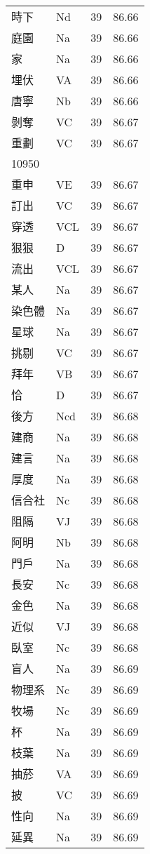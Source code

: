 \documentclass[twocolumn]{book}
\begin{document}
\begin{supertabular}{llrr}
時下 & Nd & 39 &  86.66\\
庭園 & Na & 39 &  86.66\\
家 & Na & 39 &  86.66\\
埋伏 & VA & 39 &  86.66\\
唐寧 & Nb & 39 &  86.66\\
剝奪 & VC & 39 &  86.67\\
重劃 & VC & 39 &  86.67\\
10950\\
重申 & VE & 39 &  86.67\\
訂出 & VC & 39 &  86.67\\
穿透 & VCL & 39 &  86.67\\
狠狠 & D & 39 &  86.67\\
流出 & VCL & 39 &  86.67\\
某人 & Na & 39 &  86.67\\
染色體 & Na & 39 &  86.67\\
星球 & Na & 39 &  86.67\\
挑剔 & VC & 39 &  86.67\\
拜年 & VB & 39 &  86.67\\
恰 & D & 39 &  86.67\\
後方 & Ncd & 39 &  86.68\\
建商 & Na & 39 &  86.68\\
建言 & Na & 39 &  86.68\\
厚度 & Na & 39 &  86.68\\
信合社 & Nc & 39 &  86.68\\
阻隔 & VJ & 39 &  86.68\\
阿明 & Nb & 39 &  86.68\\
門戶 & Na & 39 &  86.68\\
長安 & Nc & 39 &  86.68\\
金色 & Na & 39 &  86.68\\
近似 & VJ & 39 &  86.68\\
臥室 & Nc & 39 &  86.68\\
盲人 & Na & 39 &  86.69\\
物理系 & Nc & 39 &  86.69\\
牧場 & Nc & 39 &  86.69\\
杯 & Na & 39 &  86.69\\
枝葉 & Na & 39 &  86.69\\
抽菸 & VA & 39 &  86.69\\
披 & VC & 39 &  86.69\\
性向 & Na & 39 &  86.69\\
延異 & Na & 39 &  86.69\\

\end{supertabular}
\end{document}
